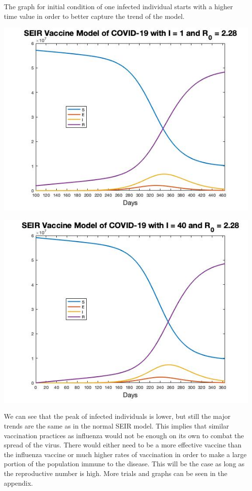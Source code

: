 \documentclass[12pt, a4paper]{article}
\begin{document}
       The graph for initial condition of one infected individual starts with a higher time value in order to better capture the trend of the model.
        
        \includegraphics[scale=0.75]{plots/i1_seir_vac.jpg}
        
        \includegraphics[scale=0.75]{plots/i40_seir_vac.jpg}
        
        We can see that the peak of infected individuals is lower, but still the major trends are the same as in the normal SEIR model. This implies that similar vaccination practices as influenza would not be enough on its own to combat the spread of the virus. There would either need to be a more effective vaccine than the influenza vaccine or much higher rates of vaccination in order to make a large portion of the population immune to the disease. This will be the case as long as the reproductive number is high. More trials and graphs can be seen in the appendix.
        
\end{document}
